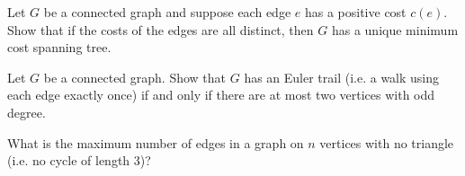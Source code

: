\documentclass[answers]{exam}
\begin{document}
\begin{questions}



\question%
Let $G$ be a connected graph and suppose each edge $e$ has a positive cost $c(e)$. Show that if the costs of the edges are all distinct, then $G$ has a unique minimum cost spanning tree.



\question%
Let $G$ be a connected graph. Show that $G$ has an Euler trail (i.e. a walk using each edge exactly once) if and only if there are at most two vertices with odd degree.



\question%
What is the maximum number of edges in a graph on $n$ vertices with no triangle (i.e. no cycle of length 3)?

\end{questions}
\end{document}
